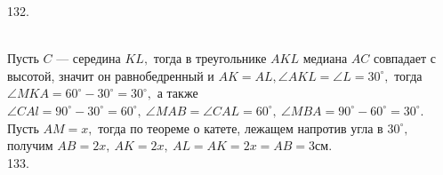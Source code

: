 \documentclass[12pt]{article}
\begin{document}
132. \begin{figure}[ht!]
\end{figure}\\
Пусть $C$ --- середина $KL,$ тогда в треугольнике $AKL$ медиана $AC$ совпадает с высотой, значит он равнобедренный и  $AK=AL, \angle AKL=\angle L=30^\circ,$ тогда $\angle MKA=60^\circ-30^\circ=30^\circ,$ а также $\angle CAl=90^\circ-30^\circ=60^\circ,\ \angle MAB=\angle CAL=60^\circ,\ \angle MBA=90^\circ-60^\circ=30^\circ.$
Пусть $AM=x,$ тогда по теореме о катете, лежащем напротив угла в $30^\circ,$ получим $AB=2x,\ AK=2x,\ AL=AK=2x=AB=3$см.\\
133. \begin{figure}[ht!]
\end{figure}\\
\end{document}
